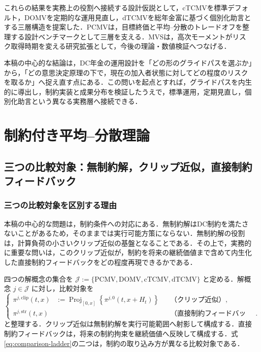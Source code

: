 \documentclass[10pt,a4paper]{article}
\theoremstyle{plain}
\theoremstyle{definition}
\DeclareMathOperator{\Proj}{Proj}
\begin{document}
これらの結果を実務上の役割へ接続する設計仮説として，cTCMVを標準デフォルト，DOMVを定期的な運用見直し，dTCMVを総年金富に基づく個別化助言とする三層構造を提案した．PCMVは，目標終価と平均--分散のトレードオフを整理する設計ベンチマークとして三層を支える．MVSは，高次モーメントがリスク取得時期を変える研究拡張として，今後の理論・数値検証へつなげる．

本稿の中心的な結論は，DC年金の運用設計を「どの形のグライドパスを選ぶか」から，「どの意思決定原理の下で，現在の加入者状態に対してどの程度のリスクを取るか」へ捉え直す点にある．この問いを起点とすれば，グライドパスを内生的に導出し，制約実装と成果分布を検証したうえで，標準運用，定期見直し，個別化助言という異なる実務層へ接続できる．

\FloatBarrier\clearpage\appendix
\small
\setlength{\abovedisplayskip}{4pt plus 1pt}
\setlength{\belowdisplayskip}{4pt plus 1pt}

\section{制約付き平均--分散理論}
\label{sec:theory}

\subsection{三つの比較対象：無制約解，クリップ近似，直接制約フィードバック}
\label{sec:strict-clip}

\subsubsection{三つの比較対象を区別する理由}

本稿の中心的な問題は，制約条件への対応にある．無制約解はDC制約を満たさないことがあるため，そのままでは実行可能方策にならない．無制約解の役割は，計算負荷の小さいクリップ近似の基盤となることである．その上で，実務的に重要な問いは，このクリップ近似が，制約を将来の継続価値まで含めて内生化した直接制約フィードバックをどの程度再現できるかである．

四つの解概念の集合を $\mathcal J:=\{\mathrm{PCMV},\mathrm{DOMV},\mathrm{cTCMV},\mathrm{dTCMV}\}$ と定める．解概念 $j\in\mathcal J$ に対し，比較対象を
\begin{equation}
\left\{
\begin{aligned}
\pi^{j,\mathrm{clip}}(t,x)
&:=\Proj_{[0,x]}\!\left\{\pi^{j,0}(t,x+H_t)\right\}
&&\text{（クリップ近似）},\\
\pi^{j,\mathrm{str}}(t,x)
&&&\text{（直接制約フィードバック）}.
\end{aligned}
\right.
\label{eq:comparison-ladder}
\end{equation}
と整理する．クリップ近似は無制約解を実行可能範囲へ射影して構成する．直接制約フィードバックは，将来の制約拘束を継続価値へ反映して構成する．式\eqref{eq:comparison-ladder}の二つは，制約の取り込み方が異なる比較対象である．
\end{document}
